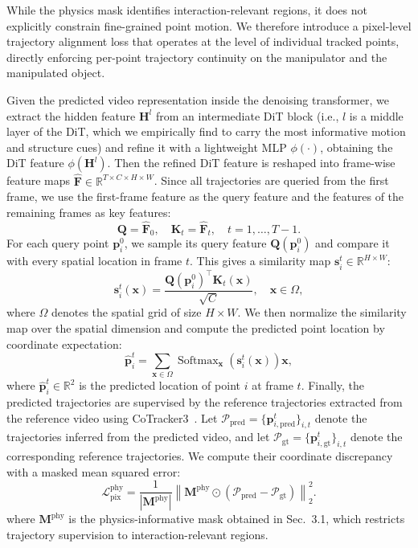 While the physics mask identifies interaction-relevant regions, it does not explicitly constrain
fine-grained point motion. We therefore introduce a pixel-level trajectory alignment loss that
operates at the level of individual tracked points, directly enforcing per-point trajectory
continuity on the manipulator and the manipulated object.

Given the predicted video representation inside the denoising transformer, we extract the hidden
feature $\mathbf{H}^{l}$ from an intermediate DiT block (i.e., $l$ is a middle layer of the DiT, which
we empirically find to carry the most informative motion and structure cues) and refine it with a
lightweight MLP $\phi(\cdot)$, obtaining the DiT feature $\phi(\mathbf{H}^{l})$. Then the refined DiT feature is reshaped into frame-wise feature maps $\hat{\mathbf{F}} \in \mathbb{R}^{T\times C\times H\times W}$. Since all trajectories are queried
from the first frame, we use the first-frame feature as the query feature and the features of the
remaining frames as key features:
\begin{equation}
\mathbf{Q}
=
\hat{\mathbf{F}}_{0},
\quad
\mathbf{K}_{t}
=
\hat{\mathbf{F}}_{t},
\quad
t=1,\dots,T-1 .
\end{equation}
For each query point $\mathbf{p}_i^0$, we sample its query feature $\mathbf{Q}(\mathbf{p}_i^0)$ and
compare it with every spatial location in frame $t$. This gives a similarity map
$\mathbf{s}_i^t\in\mathbb{R}^{H\times W}$:
\begin{equation}
\mathbf{s}_i^t(\mathbf{x})=
\frac{
\mathbf{Q}(\mathbf{p}_i^0)^\top \mathbf{K}_t(\mathbf{x})
}{
\sqrt{C}
},
\quad \mathbf{x}\in\Omega ,
\end{equation}
where $\Omega$ denotes the spatial grid of size $H\times W$. We then normalize the similarity map over the spatial dimension and compute the predicted point
location by coordinate expectation:
\begin{equation}
\hat{\mathbf{p}}_i^t
=
\sum_{\mathbf{x}\in\Omega}
\operatorname{Softmax}_{\mathbf{x}}\left(\mathbf{s}_i^t(\mathbf{x})\right)\mathbf{x},
\end{equation}
where $\hat{\mathbf{p}}_i^t\in\mathbb{R}^2$ is the predicted location of point $i$ at frame $t$. Finally, the predicted trajectories are supervised by the reference trajectories extracted from the
reference video using CoTracker3~\cite{karaev24cotracker3}. Let
$\mathcal{P}_{\mathrm{pred}}=\{\mathbf{p}_{i,\mathrm{pred}}^t\}_{i,t}$ denote the trajectories inferred from the predicted
video, and let $\mathcal{P}_{\mathrm{gt}}=\{\mathbf{p}_{i,\mathrm{gt}}^t\}_{i,t}$ denote the corresponding
reference trajectories. We compute their coordinate discrepancy with a masked mean squared error:
\begin{equation}
\mathcal{L}^{\mathrm{phy}}_{\mathrm{pix}}
=
\frac{1}{|\mathbf{M}^{\mathrm{phy}}|}
\left\|
\mathbf{M}^{\mathrm{phy}}\odot
\left(
\mathcal{P}_{\mathrm{pred}}-\mathcal{P}_{\mathrm{gt}}
\right)
\right\|_2^2 .
\end{equation}
where $\mathbf{M}^{\mathrm{phy}}$ is the physics-informative mask obtained in Sec.~3.1, which restricts trajectory
supervision to interaction-relevant regions.

